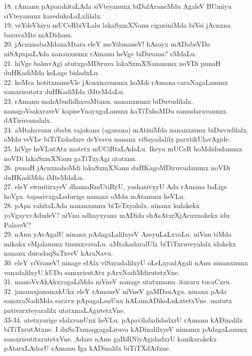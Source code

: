 \documentclass{article}
\begin{document}
18. rAmanu pAparahitaLAda siVteyanunx biDalAraneMdu AgaleV BUmiyu siVteyanunx karedukoLaLxlilalx.\\
19. veYdeVhiyu mUCeRbiVLalu lakaSxmXNanu ciguriniMda biVsi jAcnxna baruvaMte mADidanu.\\
20. jAcnxnabaMdanaMtara eleY meYdunaneV! hAsayx mADabeVDa niSApxpaLAda nananxnunx rAmanu heVge biDuvanu? eMdaLu.\\
21. hiVge bahuvAgi atutxgoMDiruva lakaSxmXNananunx noVDi punaH duHKadiMda keLage bidadxLu.\\
22. koMca hotitxnameVle jAcnxnavanunx hoMdi rAmana caraNagaLanunx samxrisutatx duHKadiMda iMteMdaLu.\\
23. rAmanu mahAbudidhxvaMtanu. nananxnunx biDuvudilalx. nanagoVsakxraveV kapiseYnayxgaLanunx kaTiTxkoMDu samudarxvanunx dATiruvanalalx.\\
24. aMtahavanu obabx rajakana (agasana) mAtiniMda nananxnunx biDuvudilalx. oMdu veVLe biTiTxdadxre deYvavu nananx viSayadalilx parxtikUlavAgide.\\
25. hiVge heVLutAtx matetx mUCiRtaLAdaLu. Ikeyu mUCeR hoMdidudanunx noVDi lakaSxmXNanu gaTiTxyAgi atatxnu.\\
26. punaH jAcnxnahoMdi lakaSxmXNanu duHKagoMDiruvudanunx noVDi duHKadiMda iMteMdaLu.\\
27. eleY swmitirxyeV dhamaRmUtiRyU, yashasivxyU Ada rAmana baLige hoVgu. tapasivxgaLedurige nananx oMdu mAtanunx heVLu.\\
28. pApa rahitaLAda nananxnunx biTeTxyalalx. ninanx kulakekx yoVgayxvAdudeV? niVnu adhayxyana mADida shAsAtxrXjAcnxnakekx idu PalaveV?\\
29. nAnu yAvAgalU ninanx pAdagaLalilxyeV AseyuLaLxvaLu. niVnu tiMda mikakx eMjalanunx tinunxvavaLu. aMtahadaralUlx biTiTxruveyalalx idakekx nananx duradaqSaTxveV kAraNavu.\\
30. eleY viVraneV! ninage elAlx viSayadalilxyU oLeLxyadAgali nAnu ninanxnunx vanadalilxyU kUDa samxrisutAtx pArxNadiMdirutetxVne.\\
31. manoVvAkAkxyagaLiMda niVneV nanage utatxmanu. itararu tucaCxru.\\
32. janamxjanamxkUkx eleY rAmaneV niVneV gaMDanAgu. ninanx pAda samxraNadiMda saravx pApagaLanUnx hALumADikoLuLxtetxVne. matutx pativarxteyaralilx utatxmaLAgutetxVne.\\
33-34. atetxyarige elalxvanUnx heVLu. pApavilalxdidadxrU rAmanu kADinalilx biTiTxrutAtxne. I duSaTxmaqgagaLiruva kADinalilxyeV nimamx pAdagaLanunx samxrisutitxrutetxVne. Adare nAnu gaBiRNiyAgidadxrU kanikarakekx pAtarxLAdarU rAmanu Iga kADinalilx biTiTXdAdxne.\\
\end{document}
